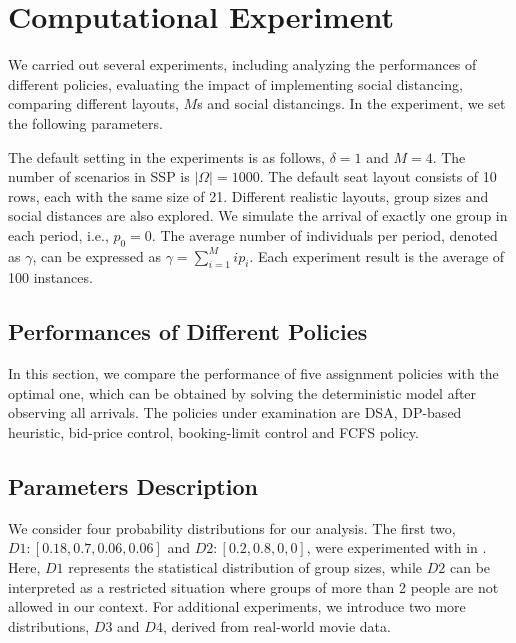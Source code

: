 \section{Computational Experiment}\label{sec_result}
We carried out several experiments, including analyzing the performances of different policies, evaluating the impact of implementing social distancing, comparing different layouts, $M$s and social distancings. In the experiment, we set the following parameters. 

The default setting in the experiments is as follows, $\delta =1$ and $M =4$. The number of scenarios in SSP is $|\Omega| = 1000$. The default seat layout consists of 10 rows, each with the same size of 21. Different realistic layouts, group sizes and social distances are also explored. We simulate the arrival of exactly one group in each period, i.e., $p_0 = 0$. The average number of individuals per period, denoted as $\gamma$, can be expressed as $\gamma = \sum_{i=1}^{M} i p_i$. Each experiment result is the average of 100 instances.

\subsection{Performances of Different Policies}
In this section, we compare the performance of five assignment policies with the optimal one, which can be obtained by solving the deterministic model after observing all arrivals. The policies under examination are DSA, DP-based heuristic, bid-price control, booking-limit control and FCFS policy.

\subsection*{Parameters Description}
We consider four probability distributions for our analysis. The first two, $D1:[0.18,0.7,0.06,0.06]$ and $D2:[0.2,0.8,0,0]$, were experimented with in \cite{blom2022filling}. 
Here, $D1$ represents the statistical distribution of group sizes, while $D2$ can be interpreted as a restricted situation where groups of more than 2 people are not allowed in our context. For additional experiments, we introduce two more distributions, $D3$ and $D4$, derived from real-world movie data.

